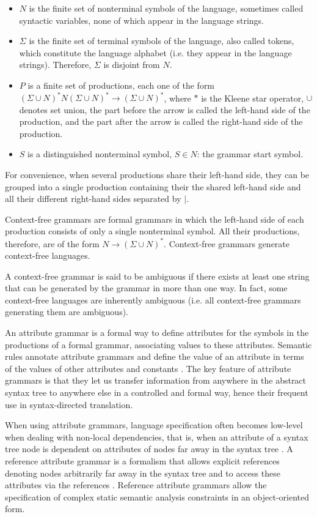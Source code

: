 \documentclass[preprint]{elsarticle}
\begin{document}
\begin{itemize}
\item $N$ is the finite set of nonterminal symbols of the language, sometimes called syntactic variables, none of which appear in the language strings.
\item $\Sigma$ is the finite set of terminal symbols of the language, also called tokens, which constitute the language alphabet (i.e. they appear in the language strings).
      Therefore, $\Sigma$ is disjoint from $N$.
\item $P$ is a finite set of productions, each one of the form $(\Sigma \cup N)^{*} N (\Sigma \cup N)^{*} \rightarrow (\Sigma \cup N)^{*}$, where $*$ is the Kleene star operator, $\cup$ denotes set union, the part before the arrow is called the left-hand side of the production, and the part after the arrow is called the right-hand side of the production.
\item $S$ is a distinguished nonterminal symbol, $S \in N$: the grammar start symbol.
\end{itemize}

For convenience, when several productions share their left-hand side, they can be grouped into a single production containing their the shared left-hand side and all their different right-hand sides separated by $|$.

Context-free grammars are formal grammars in which the left-hand side of each production consists of only a single nonterminal symbol.
All their productions, therefore, are of the form $N \rightarrow (\Sigma \cup N)^{*}$. Context-free grammars generate context-free languages.

A context-free grammar is said to be ambiguous if there exists at least one string that can be generated by the grammar in more than one way.
In fact, some context-free languages are inherently ambiguous (i.e. all context-free grammars generating them are ambiguous).

An attribute grammar is a formal way to define attributes for the symbols in the productions of a formal grammar, associating values to these attributes.
Semantic rules annotate attribute grammars and define the value of an attribute in terms of the values of other attributes and constants \cite{Aho2006}.
The key feature of attribute grammars is that they let us transfer information from anywhere in the abstract syntax tree to anywhere else in a controlled and formal way, hence their frequent use in syntax-directed translation.

When using attribute grammars, language specification often becomes low-level when dealing with non-local dependencies, that is, when an attribute of a syntax tree node is dependent on attributes of nodes far away in the syntax tree \cite{boyland:98fiber}.
A reference attribute grammar is a formalism that allows explicit references denoting nodes arbitrarily far away in the syntax tree and to access these attributes via the references \cite{Hedin1987}.
Reference attribute grammars allow the specification of complex static semantic analysis constraints in an object-oriented form.
\end{document}
